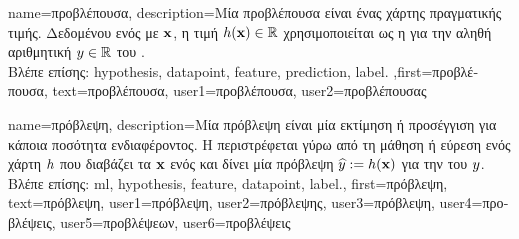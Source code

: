 {name={\foreignlanguage{greek}{προβλέπουσα}},
	description={\foreignlanguage{greek}{Μία προβλέπουσα είναι ένας χάρτης}  
		\foreignlanguage{greek}{πραγματικής τιμής. Δεδομένου ενός}  \foreignlanguage{greek}{με}  
		${\bf x}$, \foreignlanguage{greek}{η τιμή $h({\bf x}) \in \mathbb{R}$ χρησιμοποιείται ως η}  
		\foreignlanguage{greek}{για την αληθή αριθμητική}  $y \in \mathbb{R}$ \foreignlanguage{greek}{του} .\\
		\foreignlanguage{greek}{Βλέπε επίσης:} \gls{hypothesis}, \gls{datapoint}, \gls{feature}, \gls{prediction}, \gls{label}.
		},first={\foreignlanguage{greek}{προβλέπουσα}},
		text={\foreignlanguage{greek}{προβλέπουσα}},
		user1={\foreignlanguage{greek}{προβλέπουσα}}, %
  		user2={\foreignlanguage{greek}{προβλέπουσας}} %
}

{name={\foreignlanguage{greek}{πρόβλεψη}},
	description={\foreignlanguage{greek}{Μία πρόβλεψη} 
		\foreignlanguage{greek}{είναι μία εκτίμηση ή προσέγγιση για κάποια ποσότητα ενδιαφέροντος. Η} 
		 \foreignlanguage{greek}{περιστρέφεται γύρω από τη μάθηση ή εύρεση ενός χάρτη}  $h$ 
		\foreignlanguage{greek}{που διαβάζει τα}  ${\bf x}$ \foreignlanguage{greek}{ενός}  
		\foreignlanguage{greek}{και δίνει μία πρόβλεψη $\widehat{y} := h({\bf x})$ για την}  
		\foreignlanguage{greek}{του} $y$.\\
		\foreignlanguage{greek}{Βλέπε επίσης:} \gls{ml}, \gls{hypothesis}, \gls{feature}, \gls{datapoint}, \gls{label}.},
	first={\foreignlanguage{greek}{πρόβλεψη}},
	text={\foreignlanguage{greek}{πρόβλεψη}},
	user1={\foreignlanguage{greek}{πρόβλεψη}}, %
  	user2={\foreignlanguage{greek}{πρόβλεψης}}, %
	user3={\foreignlanguage{greek}{πρόβλεψη}}, %
	user4={\foreignlanguage{greek}{προβλέψεις}}, %
	user5={\foreignlanguage{greek}{προβλέψεων}}, %
	user6={\foreignlanguage{greek}{προβλέψεις}} %
}

